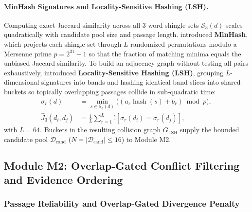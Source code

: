 \documentclass[11pt]{article}
\begin{document}
\paragraph{MinHash Signatures and Locality-Sensitive Hashing (LSH).}
Computing exact Jaccard similarity across all 3-word shingle sets $\mathcal{S}_3(d)$ scales quadratically with candidate pool size and passage length. \citet{broder1997resemblance} introduced \textbf{MinHash}, which projects each shingle set through $L$ randomized permutations modulo a Mersenne prime $p = 2^{31}-1$ so that the fraction of matching minima equals the unbiased Jaccard similarity. To build an adjacency graph without testing all pairs exhaustively, \citet{indyk1998lsh} introduced \textbf{Locality-Sensitive Hashing (LSH)}, grouping $L$-dimensional signatures into bands and hashing identical band slices into shared buckets so topically overlapping passages collide in sub-quadratic time:
\begin{align}
\sigma_r(d) &= \min_{s \in \mathcal{S}_3(d)} \bigl( (a_r \operatorname{hash}(s) + b_r) \bmod p \bigr), \label{eq:m1_minhash} \\
\hat{J}_3(d_i, d_j) &= \frac{1}{L}\sum_{r=1}^L \mathbb{I}\left[\sigma_r(d_i) = \sigma_r(d_j)\right], \label{eq:m1_j3}
\end{align}
with $L=64$. Buckets in the resulting collision graph $G_{\text{LSH}}$ supply the bounded candidate pool $\mathcal{D}_{\text{cand}}$ ($N = |\mathcal{D}_{\text{cand}}| \le 16$) to Module M2.

\subsection{Module M2: Overlap-Gated Conflict Filtering and Evidence Ordering}

\subsubsection{Passage Reliability and Overlap-Gated Divergence Penalty}
\end{document}
